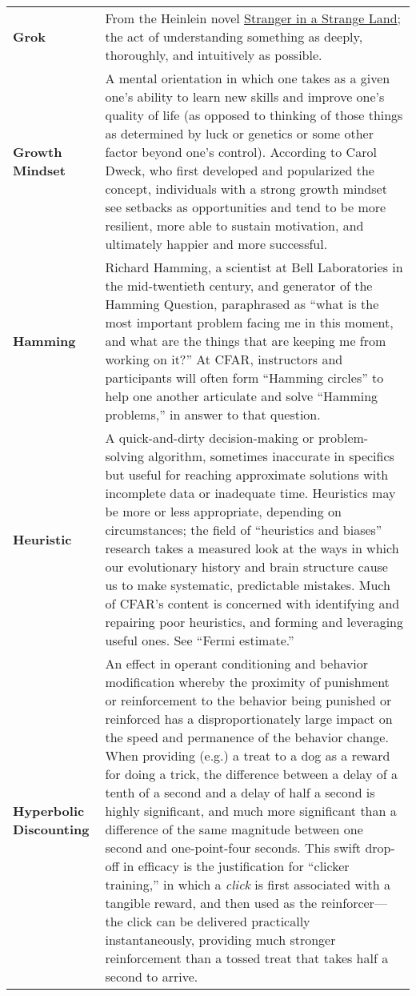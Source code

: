 \begin{longtable} { p{} p{} }
\textbf{Grok} & From the Heinlein novel \underline{Stranger in a Strange Land}; the act of understanding something as deeply, thoroughly, and intuitively as possible.\\

\textbf{Growth Mindset} & A mental orientation in which one takes as a given one's ability to learn new skills and improve one's quality of life (as opposed to thinking of those things as determined by luck or genetics or some other factor beyond one's control).  According to Carol Dweck, who first developed and popularized the concept, individuals with a strong growth mindset see setbacks as opportunities and tend to be more resilient, more able to sustain motivation, and ultimately happier and more successful.\\

\textbf{Hamming} & Richard Hamming, a scientist at Bell Laboratories in the mid-twentieth century, and generator of the Hamming Question, paraphrased as ``what is the most important problem facing me in this moment, and what are the things that are keeping me from working on it?''  At CFAR, instructors and participants will often form ``Hamming circles'' to help one another articulate and solve ``Hamming problems,'' in answer to that question.\\

\textbf{Heuristic} & A quick-and-dirty decision-making or problem-solving algorithm, sometimes inaccurate in specifics but useful for reaching approximate solutions with incomplete data or inadequate time.  Heuristics may be more or less appropriate, depending on circumstances; the field of ``heuristics and biases'' research takes a measured look at the ways in which our evolutionary history and brain structure cause us to make systematic, predictable mistakes.  Much of CFAR's content is concerned with identifying and repairing poor heuristics, and forming and leveraging useful ones.  See ``Fermi estimate.''\\

\textbf{Hyperbolic Discounting} & An effect in operant conditioning and behavior modification whereby the proximity of punishment or reinforcement to the behavior being punished or reinforced has a disproportionately large impact on the speed and permanence of the behavior change.  When providing (e.g.) a treat to a dog as a reward for doing a trick, the difference between a delay of a tenth of a second and a delay of half a second is highly significant, and much more significant than a difference of the same magnitude between one second and one-point-four seconds.  This swift drop-off in efficacy is the justification for ``clicker training,'' in which a \emph{click} is first associated with a tangible reward, and then used as the reinforcer---the click can be delivered practically instantaneously, providing much stronger reinforcement than a tossed treat that takes half a second to arrive.\\


\end{longtable}
